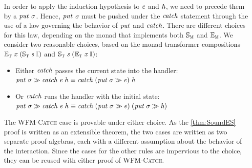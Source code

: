 

In order to apply the induction hypothesis to \ensuremath{\Varid{e}} and \ensuremath{\Varid{h}}, we need to precede
them by a $\mathit{put}~\sigma$.  Hence, \ensuremath{\Varid{put}} $\sigma$ must be pushed under the \ensuremath{\Varid{catch}}
statement through the use of a law governing the behavior of \ensuremath{\Varid{put}} and \ensuremath{\Varid{catch}}.
There are different choices for this law, depending on the monad
that implements both \ensuremath{\mathbb{S}_{\scalebox{0.6}{M}}} and \ensuremath{\mathbb{E}_{\scalebox{0.6}{M}}}. We consider
two reasonable choices, based on the monad transformer compositions \ensuremath{\mathbb{E}_{\scalebox{0.6}{T}}\;\Varid{x}\;(\mathbb{S}_{\scalebox{0.6}{T}}\;\Varid{s}\;\mathbb{I})}
and \ensuremath{\mathbb{S}_{\scalebox{0.6}{T}}\;\Varid{s}\;(\mathbb{E}_{\scalebox{0.6}{T}}\;\Varid{x}\;\mathbb{I})}:
\begin{itemize}
\item Either \ensuremath{\Varid{catch}} passes the current state into the handler:\\
 \ensuremath{\Varid{put}\;\sigma\sequ \Varid{catch}\;\Varid{e}\;\Varid{h}\equiv \Varid{catch}\;(\Varid{put}\;\sigma\sequ \Varid{e})\;\Varid{h}}
\item Or \ensuremath{\Varid{catch}} runs the handler with the initial state:\\
\ensuremath{\Varid{put}\;\sigma\sequ \Varid{catch}\;\Varid{e}\;\Varid{h}\equiv \Varid{catch}\;(\Varid{put}\;\sigma\sequ \Varid{e})\;(\Varid{put}\;\sigma\sequ \Varid{h})}
\end{itemize}
The \textsc{WFM-Catch} case is provable under either choice.
As the \ref{thm:SoundES} proof
is written as an extensible theorem, the two cases are written as
two separate proof algebras, each with a different assumption about
the behavior of the interaction. Since the cases for the other rules are
impervious to the choice, they can be reused with either proof of
\textsc{WFM-Catch}.


